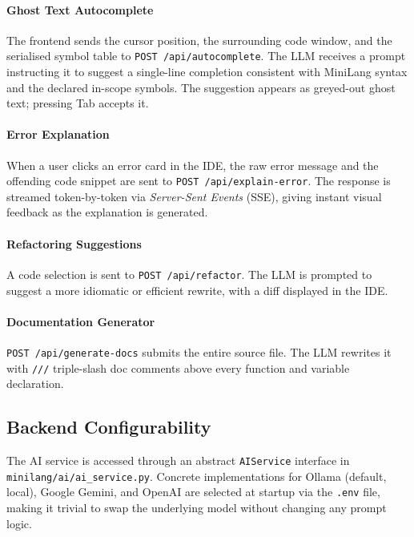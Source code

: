 \documentclass[conference]{IEEEtran}
\begin{document}
\paragraph{Ghost Text Autocomplete}
The frontend sends the cursor position, the surrounding code window,
and the serialised symbol table to \texttt{POST /api/autocomplete}. The
LLM receives a prompt instructing it to suggest a single-line
completion consistent with MiniLang syntax and the declared in-scope
symbols. The suggestion appears as greyed-out ghost text; pressing Tab
accepts it.

\paragraph{Error Explanation}
When a user clicks an error card in the IDE, the raw error message and
the offending code snippet are sent to \texttt{POST /api/explain-error}.
The response is streamed token-by-token via \textit{Server-Sent Events}
(SSE), giving instant visual feedback as the explanation is generated.

\paragraph{Refactoring Suggestions}
A code selection is sent to \texttt{POST /api/refactor}. The LLM is
prompted to suggest a more idiomatic or efficient rewrite, with a diff
displayed in the IDE.

\paragraph{Documentation Generator}
\texttt{POST /api/generate-docs} submits the entire source file. The
LLM rewrites it with \texttt{///} triple-slash doc comments above every
function and variable declaration.

\subsection{Backend Configurability}

The AI service is accessed through an abstract \texttt{AIService}
interface in \texttt{minilang/ai/ai\_service.py}. Concrete
implementations for Ollama (default, local), Google Gemini, and OpenAI
are selected at startup via the \texttt{.env} file, making it trivial
to swap the underlying model without changing any prompt logic.

\end{document}
